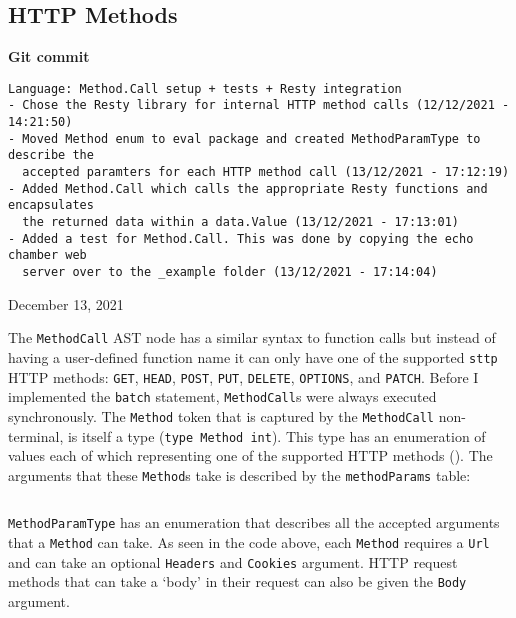 \subsection{HTTP Methods}

\begin{center}
    \textbf{Git commit}
    \begin{verbatim}
Language: Method.Call setup + tests + Resty integration
- Chose the Resty library for internal HTTP method calls (12/12/2021 - 14:21:50)
- Moved Method enum to eval package and created MethodParamType to describe the
  accepted paramters for each HTTP method call (13/12/2021 - 17:12:19)
- Added Method.Call which calls the appropriate Resty functions and encapsulates
  the returned data within a data.Value (13/12/2021 - 17:13:01)
- Added a test for Method.Call. This was done by copying the echo chamber web
  server over to the _example folder (13/12/2021 - 17:14:04)
    \end{verbatim}
    \vspace{-1em}
    \tiny{December 13, 2021}
\end{center}

The \verb|MethodCall| AST node has a similar syntax to function calls but instead of having a user-defined function name it can only have one of the supported \verb|sttp| HTTP methods\textsuperscript{\cite{http_request_methods}}: \verb|GET|, \verb|HEAD|, \verb|POST|, \verb|PUT|, \verb|DELETE|, \verb|OPTIONS|, and \verb|PATCH|. Before I implemented the \verb|batch| statement, \verb|MethodCall|s were always executed synchronously. The \verb|Method| token that is captured by the \verb|MethodCall| non-terminal, is itself a type (\texttt{type Method int}). This type has an enumeration of values each of which representing one of the supported HTTP methods (). The arguments that these \verb|Method|s take is described by the \verb|methodParams| table:

\inputminted[firstline=76, lastline=86, autogobble, breaklines, tabsize=4]{go}{../../src/eval/methods.go}

\verb|MethodParamType| has an enumeration that describes all the accepted arguments that a \verb|Method| can take. As seen in the code above, each \verb|Method| requires a \verb|Url| and can take an optional \verb|Headers| and \verb|Cookies| argument. HTTP request methods that can take a `body' in their request can also be given the \verb|Body| argument.

